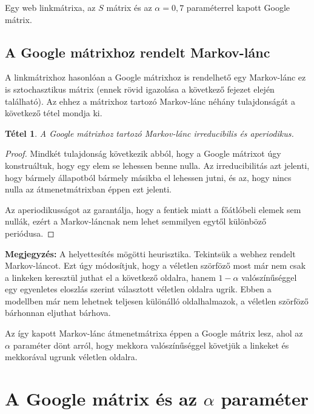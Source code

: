 \documentclass[12pt,a4paper]{article}
\newtheorem{tetel}{Tétel}
\begin{document}
\vspace{0.1 cm}
\centerline{Egy web linkmátrixa, az $S$ mátrix és az $\alpha = 0,7$ paraméterrel kapott Google mátrix.}

\subsection{A Google mátrixhoz rendelt Markov-lánc}

A linkmátrixhoz hasonlóan a Google mátrixhoz is rendelhető egy Markov-lánc ez is sztochasztikus mátrix (ennek rövid igazolása a következő fejezet elején található). Az ehhez a mátrixhoz tartozó Markov-lánc néhány tulajdonságát a következő tétel mondja ki.

\begin{tetel}
	A Google mátrixhoz tartozó Markov-lánc irreducibilis és aperiodikus.
\end{tetel}
\begin{proof}
	Mindkét tulajdonság következik abból, hogy a Google mátrixot úgy konstruáltuk, hogy egy elem se lehessen benne nulla. Az irreducibilitás azt jelenti, hogy bármely állapotból bármely másikba el lehessen jutni, és az, hogy nincs nulla az átmenetmátrixban éppen ezt jelenti. 
	
	Az aperiodikusságot az garantálja, hogy a fentiek miatt a főátlóbeli elemek sem nullák, ezért a Markov-láncnak nem lehet semmilyen egytől különböző periódusa.
\end{proof}

\vspace{0.1cm}
\textbf{Megjegyzés:} A helyettesítés mögötti heurisztika. \newline
Tekintsük a webhez rendelt Markov-láncot. Ezt úgy módosítjuk, hogy a véletlen szörföző most már nem csak a linkeken keresztül juthat el a következő oldalra, hanem $1-\alpha$ valószínűséggel egy egyenletes eloszlás szerint választott véletlen oldalra ugrik. Ebben a modellben már nem lehetnek teljesen különálló oldalhalmazok, a véletlen szörföző bárhonnan eljuthat bárhova.

Az így kapott Markov-lánc átmenetmátrixa éppen a Google mátrix lesz, ahol az $\alpha$ paraméter dönt arról, hogy mekkora valószínűséggel követjük a linkeket és mekkorával ugrunk véletlen oldalra.

\section{A Google mátrix és az $\alpha$ paraméter}
\end{document}
